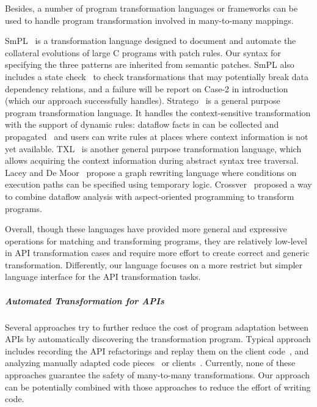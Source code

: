\documentclass[letterpaper, USenglish]{lipics-v2016}
\theoremstyle{plain}
\begin{document}
Besides, a number of program transformation languages or frameworks can be used to handle program transformation involved in many-to-many mappings. 

SmPL~\cite{DBLP:conf/eurosys/PadioleauLHM08} is a transformation language designed to document and
automate the collateral evolutions of large C programs with patch rules. Our syntax for
specifying the three patterns are inherited from semantic patches.
SmPL also includes a state check~\cite{DBLP:conf/popl/BrunelDHLM09} to check transformations that may potentially break data dependency
relations, and a failure will be report on
Case-2 in introduction (which our approach successfully handles).
Stratego~\cite{Bravenboer:2008:SLT:1385689.1385715}
is a general purpose program transformation language. It handles the
context-sensitive transformation with the support of dynamic rules: dataflow
facts in can be collected and propagated~\cite{Olmos:2005:CSD:2136624.2136643} and users can write rules at
places where context information is not yet available. TXL~\cite{Cordy:2006:TST:1149670.1149672} is another general purpose transformation language,  which allows acquiring the
context information during abstract syntax tree traversal. 
Lacey and De Moor~\cite{laceydemoor01} propose a graph rewriting language
where conditions on execution paths can be specified using temporary
logic. Crossver~\cite{sakurai2014crossver} proposed a way to combine dataflow
analysis with aspect-oriented programming to transform programs.

Overall, though these languages have provided more general and expressive operations
for matching and transforming programs, they are relatively low-level in API transformation cases
and require more effort to create correct and generic
transformation. Differently, our language focuses on a more restrict but simpler language interface for the API transformation tasks.

\subparagraph*{Automated Transformation for APIs}
Several approaches try to further reduce the cost of program adaptation between APIs by
automatically discovering the transformation program. Typical approach
includes recording the API refactorings and replay them on the client
code~\cite{Henkel:2005:CCR:1062455.1062512,DBLP:conf/icse/DigNMJ08},
and analyzing manually adapted code
pieces~\cite{Andersen:2012:SPI:2351676.2351753,%
  Nguyen:2010:GAA:1869459.1869486,Meng:2011:SEG:1993498.1993537}
or clients~\cite{Zhong:2010:MAM:1806799.1806831,DBLP:journals/jcst/WuLWM11}. Currently, none of
these approaches guarantee the safety of many-to-many
transformations. Our approach can be potentially combined with those approaches to reduce the effort of writing code.
\end{document}
